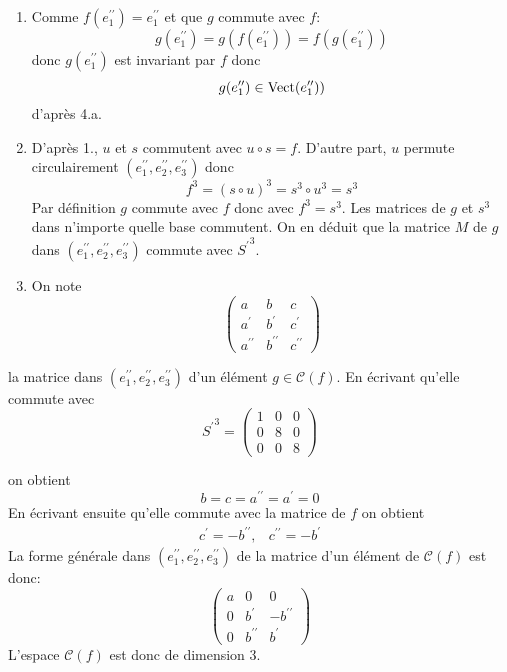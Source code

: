 \begin{enumerate}
\begin{enumerate}
\begin{enumerate}
 \item Comme $f(e^{\prime\prime}_1)=e^{\prime\prime}_1$ et que $g$ commute avec $f$:
\[g(e^{\prime\prime}_1)=g(f(e^{\prime\prime}_1))=f(g(e^{\prime\prime}_1))\]
donc $g(e^{\prime\prime}_1)$ est invariant par $f$ donc
\[g(e^{\prime\prime}_1)\in \operatorname{Vect} (e^{\prime\prime}_1))\]
d'après 4.a.
\item D'après 1., $u$ et $s$ commutent avec $u\circ s =f$. D'autre part, $u$ permute circulairement $(e^{\prime\prime}_1,e^{\prime\prime}_2,e^{\prime\prime}_3)$ donc 
\[f^3=(s\circ u)^3=s^3 \circ u^3=s^3\]
Par définition $g$ commute avec $f$ donc avec $f^3=s^3$. Les matrices de $g$ et $s^3$ dans n'importe quelle base commutent. On en déduit que la matrice $M$ de $g$ dans $(e^{\prime\prime}_1,e^{\prime\prime}_2,e^{\prime\prime}_3)$ commute avec ${S^{\prime}}^3$.
\item  On note
\[\left( \begin{array}{ccc}
a & b & c \\
a^{\prime} & b^{\prime} & c^{\prime} \\
a^{\prime\prime} & b^{\prime\prime} & c^{\prime\prime}
         \end{array}\right) \]
\end{enumerate}
la matrice dans $(e^{\prime\prime}_1,e^{\prime\prime}_2,e^{\prime\prime}_3)$ d'un élément $g\in \mathcal{C}(f)$. En écrivant qu'elle commute avec
\[{S^{\prime}}^3=\left( \begin{array}{ccc}
1 & 0 & 0 \\
0 & 8 & 0 \\
0 & 0 & 8
         \end{array}\right)\]
\end{enumerate}
on obtient 
\[b=c=a^{\prime\prime}=a^{\prime}=0\]
En écrivant ensuite qu'elle commute avec la matrice de $f$ on obtient
\begin{eqnarray*}
 c^{\prime}=-b^{\prime\prime},& c^{\prime\prime}=-b^{\prime} 
\end{eqnarray*}
La forme générale dans $(e^{\prime\prime}_1,e^{\prime\prime}_2,e^{\prime\prime}_3)$ de la matrice d'un élément de $\mathcal{C}(f)$ est donc:
\[\left( \begin{array}{ccc}
a & 0 & 0 \\
0 & b^{\prime} & -b^{\prime\prime} \\
0 & b^{\prime\prime} & b^{\prime}
         \end{array}\right) \]
L'espace $\mathcal{C}(f)$ est donc de dimension 3.
\end{enumerate}
